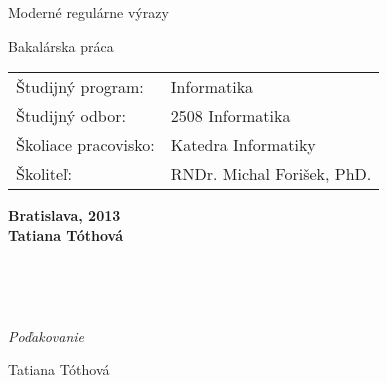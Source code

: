 \documentclass[a4paper,12pt,openany,oneside]{scrbook} %
\def\mftitle{Moderné regulárne výrazy}
\def\mfthesistype{Bakalárska práca}
\def\mfauthor{Tatiana Tóthová}
\def\mfadvisor{RNDr. Michal Forišek, PhD.}
\def\mfdate{2013}
\def\mfplacedate{Bratislava, \mfdate}
\begin{document}
\vfill
\begin{center}
\begin{minipage}{1\textwidth}
\bigskip\bigskip
\begin{center}
\linespread{1}\LARGE\sc\mftitle
\end{center}
\smallskip
\centerline{\mfthesistype}
\bigskip
\bigskip
\bigskip\bigskip
\end{minipage}
\end{center}
\vfill
\begin{minipage}{0.8\textwidth}
\begin{tabular}{l l}
Študijný program:& Informatika \\
Študijný odbor:& 2508 Informatika \\
Školiace pracovisko:& Katedra Informatiky\\
Školiteľ:&   \mfadvisor \\
\end{tabular}
\end{minipage}
\begin{center}
\end{center}
\vfill
{\bf\mfplacedate\\
\indent\mfauthor}
\eject %


% 
% 
% 



\pagestyle{plain}

{~}\vspace{12cm}

\noindent
\begin{minipage}{0.25\textwidth}~\end{minipage}
\begin{center}
\begin{minipage}{1\textwidth}
\textit{Poďakovanie}
\end{minipage}
\end{center}
\hfill\mfauthor
\vfill\eject %
\end{document}
